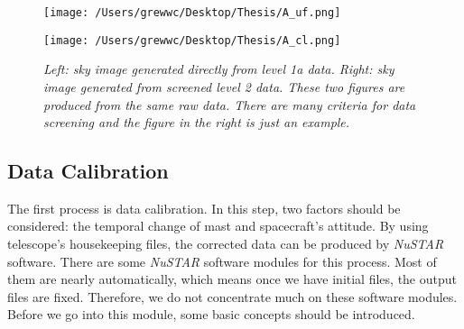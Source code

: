 \documentclass[12pt]{report}
\begin{document}
            \begin{figure}[h] 
            \vspace{0.2cm}
                \begin{minipage}{0.45\textwidth}
                \begin{flushright} 
                \texttt{[image: /Users/grewwc/Desktop/Thesis/A\_uf.png]}
            \end{flushright}
            \end{minipage}
            \hspace{1cm}
            \begin{minipage}{0.45\textwidth}
              \begin{flushleft}
                \texttt{[image: /Users/grewwc/Desktop/Thesis/A\_cl.png]}
              \end{flushleft} 
            \end{minipage}
            \centering
            \begin{minipage}[c]{0.85\textwidth}
                \caption{\textit{\footnotesize Left: sky image generated directly from level 1a data. Right: sky 
                image 
                generated from screened level 2 data. These two figures are produced from the same raw data. 
                There are 
                many criteria for data screening and the figure in the right is just an example.}}
                \label{fig:comparison}
            \end{minipage}
            \end{figure}
            
            \subsection{Data Calibration}   
                The first process is data calibration. In this step, two factors should be considered: the temporal 
                change 
                of mast and spacecraft's attitude. By using telescope's housekeeping files, the corrected data can be 
                produced by \textit{NuSTAR} software. There are some \textit{NuSTAR} software modules for this 
                process. Most of them are 
                nearly automatically, which means once we have initial files, the output files are fixed. 
                Therefore, we 
                do not concentrate much on these software modules. Before we go into this module, some basic 
                concepts should be introduced.
\end{document}
